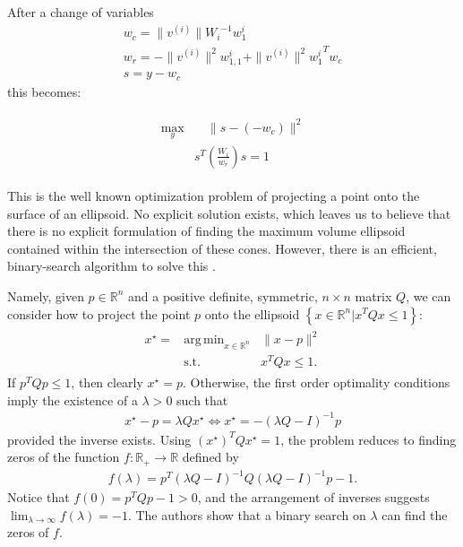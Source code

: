 \documentclass{article}
\theoremstyle{case}
\numberwithin{theorem}{subsection}
\DeclareMathOperator*{\argmin}{arg\,min}
\newcommand{\reals}{\mathbb R}
\newcommand{\Rn}{\mathbb R^n}
\begin{document}
After a change of variables
\begin{align*}
w_c = \|v^{(i)}\|{W_i}^{-1}w_1^i \\
w_r =  - \|v^{(i)}\|^2{w_{1,1}^i} + \|v^{(i)}\|^2{{w_1^i}}^Tw_c \\
s = y - w_c
\end{align*}
this becomes:

\begin{align}
\label{cone_feasibility_check}
\begin{array}{ccc}
\max_{y} & \quad \|s - \left(-w_c\right)\|^2  \\
 & s^T\left(\frac {W_i}{w_r}\right)s = 1
 \end{array}
\end{align}

This is the well known optimization problem of projecting a point onto the surface of an ellipsoid.
No explicit solution exists, which leaves us to believe that there is no explicit formulation of finding the maximum volume ellipsoid contained within the intersection of these cones.
However, there is an efficient, binary-search algorithm to solve this \cite{projecttoellipsoid}.


Namely, given 
$p \in \Rn$ and a positive definite, symmetric, $n \times n$ matrix $Q$,
we can consider how to project the point $p$ onto the ellipsoid $\left\{x \in \Rn \bigg | x^TQx \le 1 \right\}$:
\begin{align*}
\begin{array}{ccc}
x^{\star} = &\argmin_{x \in \Rn} & \|x - p\|^2 \\
& \textrm{s.t.} & x^TQx \le 1.
\end{array}
\end{align*}
If $p^TQp \le 1$, then clearly $x^{\star} = p$.
Otherwise, the first order optimality conditions imply the existence of a $\lambda > 0$ such that
\begin{align*}
x^{\star} - p = \lambda Qx^{\star} %
\Longleftrightarrow x^{\star} = -\left(\lambda Q - I\right)^{-1}p
\end{align*}
provided the inverse exists.
Using $\left(x^{\star}\right)^TQx^{\star} = 1$, the problem reduces to finding zeros of the function $f : \reals_+ \to \reals$ defined by
\begin{align*}
f(\lambda) = p^T\left(\lambda Q - I\right)^{-1}Q\left(\lambda Q - I\right)^{-1}p - 1.
\end{align*}
Notice that $f(0) = p^TQp - 1 > 0$, and the arrangement of inverses suggests $\lim_{\lambda \to \infty}f(\lambda) = -1$.
The authors show that a binary search on $\lambda$ can find the zeros of $f$.
\end{document}
